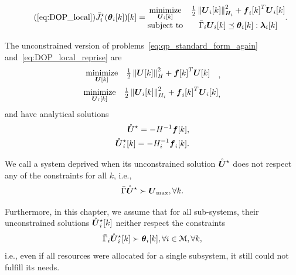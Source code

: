 \documentclass[../main.tex]{subfiles}
\begin{document}
\begin{equation}
  \label{eq:DOP_local_reprise}
  \tag{\ref*{eq:DOP_local}}
  \eqoptobji(\thetaik)[k]=
  \begin{matrix}
    \minimize\limits_{\vec{U}_{i}[k]}&\frac{1}{2}\norm{\vec{U}_{i}[k]}^{2}_{H_{i}} + {\vec{f}_{i}[k]}^{T}\vec{U}_{i}[k]\\
    \mathrm{subject~ to} & \bar{\Gamma}_{i}\vec{U}_{i}[k] \preceq \thetaik:\lambdaik
  \end{matrix}.
\end{equation}

The unconstrained version of problems~\eqref{eq:qp_standard_form_again} and~\eqref{eq:DOP_local_reprise} are
\begin{align}
  \label{eq:qp_standard_form_unconstrained}
  \begin{aligned}
    \begin{matrix}
      \mathop{\textrm{minimize}}\limits_{\boldsymbol{U}[k]} &
                                                 \frac{1}{2}\left\lVert\boldsymbol{U}[k]\right\rVert^{2}_{H} + {\boldsymbol{f}[k]}^{T}\boldsymbol{U}[k] &\\
    \end{matrix},
  \end{aligned}\\
  \label{eq:DOP_local_unconstrained}
  \begin{aligned}
    \begin{matrix}
    \mathop{\textrm{minimize}}\limits_{\boldsymbol{U}_{i}[k]}&\frac{1}{2}\left\lVert\boldsymbol{U}_{i}[k]\right\rVert^{2}_{H_{i}} + {\boldsymbol{f}_{i}[k]}^{T}\boldsymbol{U}_{i}[k]\\
    \end{matrix},
  \end{aligned}
\end{align}
and have analytical solutions~\cite{BoydVandenberghe2004}
\begin{align}
  \label{eq:qp_standard_form_unconstrained_solution}
  {\mathring{\boldsymbol{U}}^{\star}}=-H^{-1}\boldsymbol{f}[k],\\
  \label{eq:DOP_local_unconstrained_solution}
  \mathring{\boldsymbol{U}}^{\star}_i[k]=-H_{i}^{-1}\boldsymbol{f}_{i}[k].
\end{align}

We call a system deprived when its unconstrained solution ${\mathring{\boldsymbol{U}}^{\star}}$ does not respect any of the constraints for all $k$, i.e.,
\begin{equation}
\bar{\Gamma}{\mathring{\boldsymbol{U}}^{\star}}\succ {\boldsymbol{U}}_{\text{max}}, \forall k.
\end{equation}

Furthermore, in this chapter, we assume that for all sub-systems, their unconstrained solutions $\mathring{\boldsymbol{U}}^{\star}_i[k]$ neither respect the constraints
\begin{equation}
\bar{\Gamma}_{i}\optuncUik\succ \thetaik, \forall i\in\set{M}, \forall k,
\end{equation}
i.e., even if all resources were allocated for a single subsystem, it still could not fulfill its needs.
\end{document}
